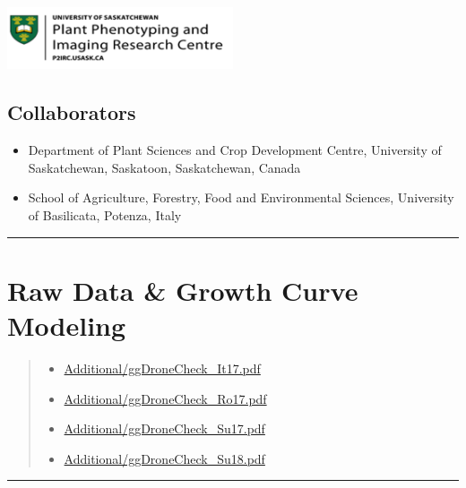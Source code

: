 \documentclass[
]{article}
\providecommand{\tightlist}{%
  \setlength{\itemsep}{0pt}\setlength{\parskip}{0pt}}
\begin{document}
\includegraphics[width=0.5\textwidth,height=\textheight]{Additional/img_P2IRC.png}

\subsection{Collaborators}\label{collaborators}

\begin{itemize}
\tightlist
\item
  Department of Plant Sciences and Crop Development Centre, University
  of Saskatchewan, Saskatoon, Saskatchewan, Canada
\item
  School of Agriculture, Forestry, Food and Environmental Sciences,
  University of Basilicata, Potenza, Italy
\end{itemize}

\begin{center}\rule{0.5\linewidth}{0.5pt}\end{center}

\section{Raw Data \& Growth Curve
Modeling}\label{raw-data-growth-curve-modeling}

\begin{quote}
\begin{itemize}
\tightlist
\item
  \href{https://github.com/derekmichaelwright/AGILE_LDP_UAV/Additional/ggDroneCheck_It17.pdf}{Additional/ggDroneCheck\_It17.pdf}
\item
  \href{https://github.com/derekmichaelwright/AGILE_LDP_UAV/Additional/ggDroneCheck_Ro17.pdf}{Additional/ggDroneCheck\_Ro17.pdf}
\item
  \href{https://github.com/derekmichaelwright/AGILE_LDP_UAV/Additional/ggDroneCheck_Su17.pdf}{Additional/ggDroneCheck\_Su17.pdf}
\item
  \href{https://github.com/derekmichaelwright/AGILE_LDP_UAV/Additional/ggDroneCheck_Su18.pdf}{Additional/ggDroneCheck\_Su18.pdf}
\end{itemize}
\end{quote}

\begin{center}\rule{0.5\linewidth}{0.5pt}\end{center}
\end{document}
